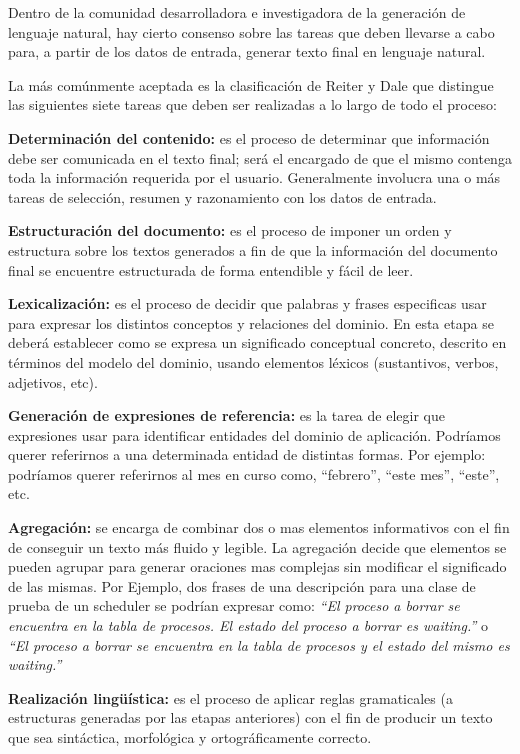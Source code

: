 Dentro de la comunidad desarrolladora e investigadora de la generación de lenguaje natural, hay cierto consenso sobre las tareas que deben llevarse a cabo para, a partir de los datos de entrada, generar texto final en lenguaje natural. 

La más comúnmente aceptada es la clasificación de Reiter y Dale que distingue las siguientes siete tareas que deben ser realizadas a lo largo de todo el proceso: 

\bigskip
\noindent
\textbf{Determinación del contenido:} es el proceso de determinar que información debe ser comunicada en el texto final; será el encargado de que el mismo contenga toda la información requerida por el usuario. Generalmente involucra una o más tareas de selección, resumen y razonamiento con los datos de entrada.

\bigskip
\noindent
\textbf{Estructuración del documento:} es el proceso de imponer un orden y estructura sobre los textos generados a fin de que la información del documento final se encuentre estructurada de forma entendible y fácil de leer.

\bigskip
\noindent
\textbf{Lexicalización:} es el proceso de decidir que palabras y frases especificas usar para expresar los distintos conceptos y relaciones del dominio. En esta etapa se deberá establecer como se expresa un significado conceptual concreto, descrito en términos del modelo del dominio, usando elementos léxicos (sustantivos, verbos, adjetivos, etc).

\bigskip
\noindent
\textbf{Generación de expresiones de referencia:} es la tarea de elegir que expresiones usar para identificar entidades del dominio de aplicación. Podríamos querer referirnos a una determinada entidad de distintas formas. Por ejemplo: podríamos querer referirnos al mes en curso como, ``febrero'', ``este mes'', ``este'', etc.

\bigskip
\noindent
\textbf{Agregación:} se encarga de combinar dos o mas elementos informativos con el fin de conseguir un texto más fluido y legible. La agregación decide que elementos se pueden agrupar para generar oraciones mas complejas sin modificar el significado de las mismas. Por Ejemplo, dos frases de una descripción para una clase de prueba de un scheduler se podrían expresar como:
\emph{``El proceso a borrar se encuentra en la tabla de procesos. El estado del proceso a borrar es waiting.''} o \emph{``El proceso a borrar se encuentra en la tabla de procesos y el estado del mismo es waiting.''}

\bigskip
\noindent
\textbf{Realización lingüística:} es el proceso de aplicar reglas gramaticales (a estructuras generadas por las etapas anteriores) con el fin de producir un texto que sea sintáctica, morfológica y ortográficamente correcto.

